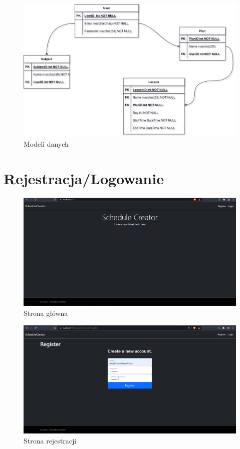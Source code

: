 \documentclass[a4paper,12pt,oneside]{book} %
\begin{document}
\begin{figure}[h]
    \centering\includegraphics[width=14cm]{entities.png}
    \caption{Modeli danych}
    \label{fig:modele}
\end{figure}

\chapter*{Rejestracja/Logowanie}


\begin{figure}[h]
    \centering\includegraphics[width=14cm]{1.png}
    \caption{Strona główna}
\end{figure}

\begin{figure}[h]
    \centering\includegraphics[width=14cm]{2.png}
    \caption{Strona rejestracji}
\end{figure}
\end{document}

